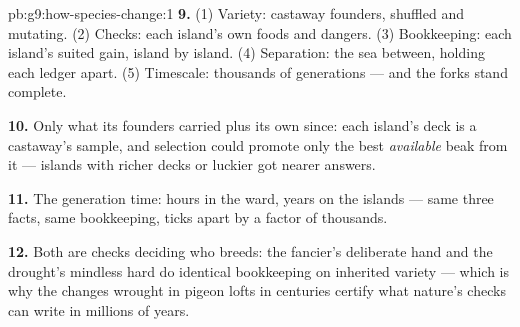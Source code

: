\begin{solution}{pb:g9:how-species-change:1}
\textbf{9.} (1) Variety: castaway founders, shuffled and
mutating. (2) Checks: each island's own foods and
dangers. (3) Bookkeeping: each island's suited 
gain, island by island. (4) Separation: the sea between,
holding each ledger apart. (5) Timescale: thousands of
generations --- and the forks stand complete.

\textbf{10.} Only what its founders carried plus its own
 since: each island's deck is a castaway's
sample, and selection could promote only the best
\emph{available} beak from it --- islands with richer
decks or luckier  got nearer answers.

\textbf{11.} The generation time: hours in the ward,
years on the islands --- same three facts, same
bookkeeping, ticks apart by a factor of thousands.

\textbf{12.} Both are checks deciding who breeds: the
fancier's deliberate hand and the drought's mindless
hard  do identical bookkeeping on inherited
variety --- which is why the changes wrought in pigeon
lofts in centuries certify what nature's checks can
write in millions of years.
\end{solution}
